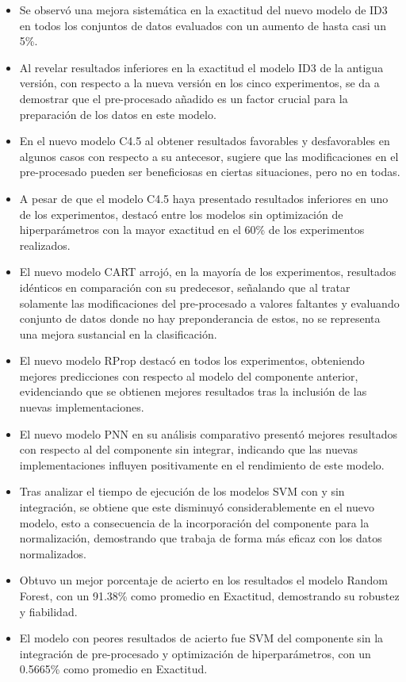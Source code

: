 	\begin{itemize}
	\item Se observó una mejora sistemática en la exactitud del nuevo modelo de ID3 en todos los conjuntos de datos evaluados con un aumento de hasta casi un 5\%.
	\item Al revelar resultados inferiores en la exactitud el modelo ID3 de la antigua versión, con respecto a la nueva versión en los cinco experimentos, se da a demostrar que el pre-procesado añadido es un factor crucial para la preparación de los datos en este modelo.
	\item En el nuevo modelo C4.5 al obtener resultados favorables y desfavorables en algunos casos con respecto a su antecesor, sugiere que las modificaciones en el pre-procesado pueden ser beneficiosas en ciertas situaciones, pero no en todas. 
	\item A pesar de que el modelo C4.5 haya presentado resultados inferiores en uno de los experimentos, destacó entre los modelos sin optimización de hiperparámetros con la mayor exactitud en el 60\% de los experimentos realizados.
	\item El nuevo modelo CART arrojó, en la mayoría de los experimentos, resultados idénticos en comparación con su predecesor, señalando que al tratar solamente las modificaciones del pre-procesado a valores faltantes y evaluando conjunto de datos donde no hay preponderancia de estos, no se representa una mejora sustancial en la clasificación.
	\item El nuevo modelo RProp destacó en todos los experimentos, obteniendo mejores predicciones con respecto al modelo del componente anterior, evidenciando que se obtienen mejores resultados tras la inclusión de las nuevas implementaciones.
	\item El nuevo modelo PNN en su análisis comparativo presentó mejores resultados con respecto al del componente sin integrar, indicando que las nuevas implementaciones influyen positivamente en el rendimiento de este modelo.
	\item Tras analizar el tiempo de ejecución de los modelos SVM con y sin integración, se obtiene que este disminuyó considerablemente en el nuevo modelo, esto a consecuencia de la incorporación del componente para la normalización, demostrando que trabaja de forma más eficaz con los datos normalizados. 
	\item Obtuvo un mejor porcentaje de acierto en los resultados el modelo Random Forest, con un 91.38\% como promedio en Exactitud, demostrando su robustez y fiabilidad.
	\item El modelo con peores resultados de acierto fue SVM del componente sin la integración de pre-procesado y optimización de hiperparámetros, con un 0.5665\% como promedio en Exactitud.
\end{itemize}


\pagebreak
